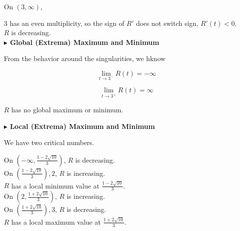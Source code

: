 \documentclass{ximera}
\begin{document}
\begin{example}
On $(3, \infty)$, 


$3$ has an even multiplicity, so the sign of $R'$ does not switch sign, $R'(t) < 0$. \\


$R$ is decreasing. \\














\textbf{\textcolor{blue!55!black}{$\blacktriangleright$ Global (Extrema) Maximum and Minimum}} 




From the behavior around the singularities, we hknow


\[
\lim\limits_{t \to 3^-}R(t) = -\infty
\]



\[
\lim\limits_{t \to 3^+}R(t) = \infty
\]


$R$ has no global maximum or minimum.



















\textbf{\textcolor{blue!55!black}{$\blacktriangleright$ Local (Extrema) Maximum and Minimum}} 


We have two critical numbers.


On $\left( -\infty, \frac{1 - 2 \sqrt{10}}{3} \right)$, $R$ is decreasing. \\


On $\left( \frac{1 - 2 \sqrt{10}}{3} \right), 2$, $R$ is increasing. \\


$R$ has a local minimum value at $\frac{1 - 2 \sqrt{10}}{3}$.  \\






On $\left( 2, \frac{1 + 2 \sqrt{10}}{3} \right)$, $R$ is increasing. \\


On $\left( \frac{1 + 2 \sqrt{10}}{3} \right), 3$, $R$ is decreasing. \\


$R$ has a local maximum value at $\frac{1 + 2 \sqrt{10}}{3}$.  \\



















\end{example}
\end{document}
